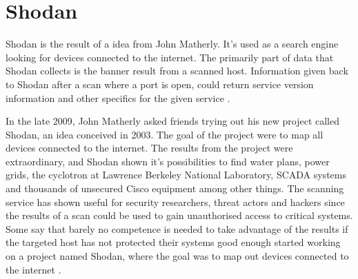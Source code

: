 \section{Shodan}
\label{s:HowShodanWorks}
Shodan is the result of a idea from John Matherly. It's used as a search engine looking for devices connected to the internet. The primarily part of data that Shodan collects is the banner result from a scanned host. Information given back to Shodan after a scan where a port is open, could return service version information and other specifics for the given service \autocite{ShodanGuide}.

In the late 2009, John Matherly asked friends trying out his new project called Shodan, an idea conceived in 2003. The goal of the project were to map all devices connected to the internet. The results from the project were extraordinary, and Shodan shown it's possibilities to find water plans, power grids, the cyclotron at Lawrence Berkeley National Laboratory, SCADA systems and thousands of unsecured Cisco equipment among other things. The scanning service has shown useful for security researchers, threat actors and hackers since the results of a scan could be used to gain unauthorised access to critical systems. Some say that barely no competence is needed to take advantage of the results if the targeted host has not protected their systems good enough started working on a project named Shodan, where the goal was to map out devices connected to the internet \autocite{Shodan2012}.